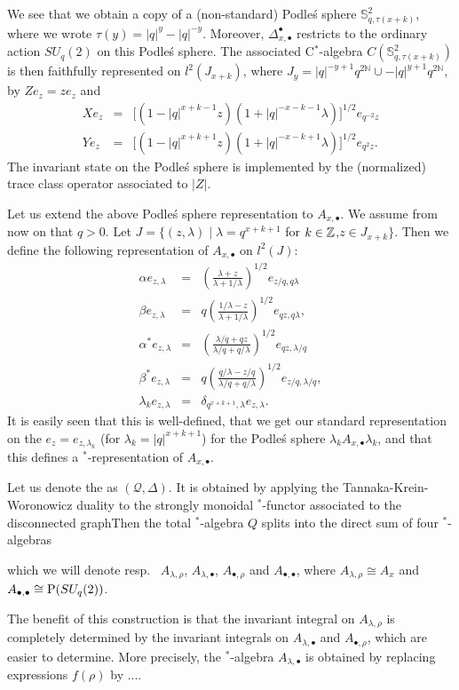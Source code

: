 We see that we obtain a copy of a (non-standard) Podle\'{s} sphere $\mathbb{S}_{q,\tau(x+k)}^2$, where we wrote $\tau(y) = |q|^{y}-|q|^{-y}$. Moreover, $\Delta_{x,\bullet}^{\bullet}$ restricts to the ordinary action $SU_q(2)$ on this Podle\'{s} sphere. The associated C$^*$-algebra $C(\mathbb{S}_{q,\tau(x+k)}^2)$ is then faithfully represented on $l^2(J_{x+k})$, where $J_y = |q|^{-y+1}q^{2\mathbb{N}}\cup -|q|^{y+1}q^{2\mathbb{N}}$, by $Ze_z = z e_{z}$ and \begin{eqnarray*} Xe_{z} &=& \lbrack (1-|q|^{x+k-1}z)(1+|q|^{-x-k-1}\lambda)\rbrack^{1/2}e_{q^{-2}z}\\ Ye_{z} &=& \lbrack (1-|q|^{x+k+1}z)(1+|q|^{-x-k+1}\lambda)\rbrack^{1/2}e_{q^2z}.\end{eqnarray*} The invariant state on the Podle\'{s} sphere is implemented by the (normalized) trace class operator associated to $|Z|$. 

Let us extend the above Podle\'{s} sphere representation to $A_{x,\bullet}$. We assume from now on that $q>0$. Let $J =\{(z,\lambda)\mid \lambda = q^{x+k+1}$ for $k\in \mathbb{Z}$,$z \in J_{x+k}\}$. Then we define the following representation of $A_{x,\bullet}$ on $l^2(J)$: \begin{eqnarray*} \alpha e_{z,\lambda} &=&  \left(\frac{\lambda+z}{\lambda+1/\lambda}\right)^{1/2}e_{z/q,q\lambda}\\ \beta e_{z,\lambda} &=& q\left( \frac{1/\lambda-z}{\lambda+1/\lambda}\right)^{1/2}e_{qz,q\lambda}, \\   \alpha^* e_{z,\lambda} &=&  \left(\frac{\lambda/q+qz}{\lambda/q+q/\lambda}\right)^{1/2}e_{qz,\lambda/q}\\ \beta^* e_{z,\lambda} &=& q\left( \frac{q/\lambda-z/q}{\lambda/q+q/\lambda}\right)^{1/2}e_{z/q,\lambda/q}, \\ \lambda_k e_{z,\lambda} &=& \delta_{q^{x+k+1},\lambda}e_{z,\lambda}. \end{eqnarray*} It is easily seen that this is well-defined, that we get our standard representation on the $e_{z} = e_{z,\lambda_k}$ (for $\lambda_k = |q|^{x+k+1}$) for the Podle\'{s} sphere $\lambda_k A_{x,\bullet}\lambda_k$, and that this defines a $^*$-representation of $A_{x,\bullet}$. 


Let us denote the as $(\mathscr{Q},\Delta)$. It is obtained by applying the Tannaka-Krein-Woronowicz duality to the strongly monoidal $^*$-functor associated to the disconnected graphThen the total $^*$-algebra $Q$ splits into the direct sum of four $^*$-algebras

  which we will denote resp.~ $A_{\lambda,\rho}$, $A_{\lambda,\bullet}$, $A_{\bullet,\rho}$ and $A_{\bullet,\bullet}$, where $A_{\lambda,\rho}\cong A_x$ and $A_{\bullet,\bullet}\cong \operatorname{\mathrm{P}}(SU_q(2))$. 

The benefit of this construction is that the invariant integral on $A_{\lambda,\rho}$ is completely determined by the invariant integrals on $A_{\lambda,\bullet}$ and $A_{\bullet,\rho}$, which are easier to determine. More precisely, the $^*$-algebra $A_{\lambda,\bullet}$ is obtained by replacing expressions $f(\rho)$ by ....




